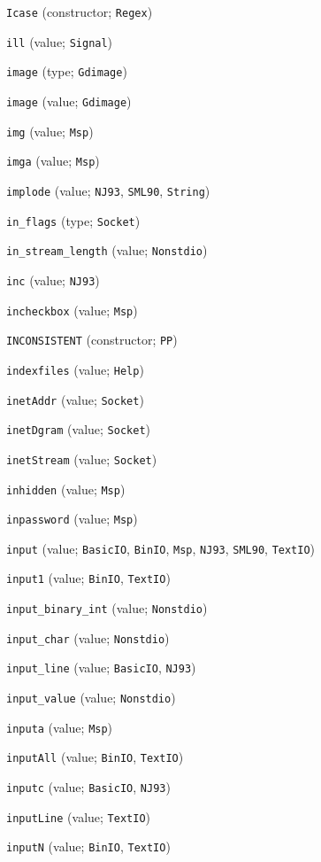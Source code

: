 \begin{description}
\item[] \verb"Icase" (constructor; \verb"Regex")
\item[] \verb"ill" (value; \verb"Signal")
\item[] \verb"image" (type; \verb"Gdimage")
\item[] \verb"image" (value; \verb"Gdimage")
\item[] \verb"img" (value; \verb"Msp")
\item[] \verb"imga" (value; \verb"Msp")
\item[] \verb"implode" (value; \verb"NJ93", \verb"SML90", \verb"String")
\item[] \verb"in_flags" (type; \verb"Socket")
\item[] \verb"in_stream_length" (value; \verb"Nonstdio")
\item[] \verb"inc" (value; \verb"NJ93")
\item[] \verb"incheckbox" (value; \verb"Msp")
\item[] \verb"INCONSISTENT" (constructor; \verb"PP")
\item[] \verb"indexfiles" (value; \verb"Help")
\item[] \verb"inetAddr" (value; \verb"Socket")
\item[] \verb"inetDgram" (value; \verb"Socket")
\item[] \verb"inetStream" (value; \verb"Socket")
\item[] \verb"inhidden" (value; \verb"Msp")
\item[] \verb"inpassword" (value; \verb"Msp")
\item[] \verb"input" (value; \verb"BasicIO", \verb"BinIO", \verb"Msp", \verb"NJ93", \verb"SML90", \verb"TextIO")
\item[] \verb"input1" (value; \verb"BinIO", \verb"TextIO")
\item[] \verb"input_binary_int" (value; \verb"Nonstdio")
\item[] \verb"input_char" (value; \verb"Nonstdio")
\item[] \verb"input_line" (value; \verb"BasicIO", \verb"NJ93")
\item[] \verb"input_value" (value; \verb"Nonstdio")
\item[] \verb"inputa" (value; \verb"Msp")
\item[] \verb"inputAll" (value; \verb"BinIO", \verb"TextIO")
\item[] \verb"inputc" (value; \verb"BasicIO", \verb"NJ93")
\item[] \verb"inputLine" (value; \verb"TextIO")
\item[] \verb"inputN" (value; \verb"BinIO", \verb"TextIO")

\end{description}
